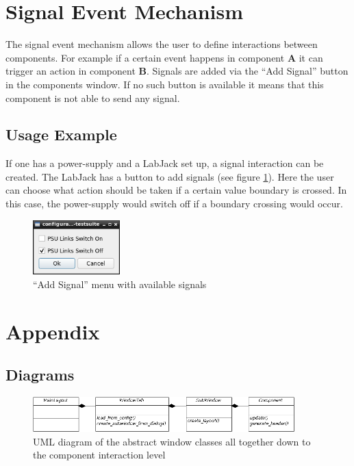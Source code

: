 \documentclass[10pt,a4paper]{article}
\begin{document}
\newpage
\section{Signal Event Mechanism}
\label{c:signal_event_mechanism}

The signal event mechanism allows the user to define interactions between components. For example if a certain event happens in component \textbf{A} it can trigger an action in component \textbf{B}. Signals are added via the \enquote{Add Signal} button in the components window. If no such button is available it means that this component is not able to send any signal.

	\subsection{Usage Example}
	
	If one has a power-supply and a LabJack set up, a signal interaction can be created. The LabJack has a button to add signals (see figure \ref{f:sem_menu}). Here the user can choose what action should be taken if a certain value boundary is crossed. In this case, the power-supply would switch off if a boundary crossing would occur.
	
	\begin{figure}[H]
	\centering
	\includegraphics[width=0.3\textwidth]{./5_sem_menu.png}
	\caption{\enquote{Add Signal} menu with available signals}
	\label{f:sem_menu}
	\end{figure}


\newpage
\appendix

\section{Appendix}

\subsection{Diagrams}

\begin{figure}[H]
\centering
\includegraphics[width=0.9\textwidth]{./A_MainLayout.png}
\caption{UML diagram of the abstract window classes all together down to the component interaction level}
\end{figure}
\end{document}
